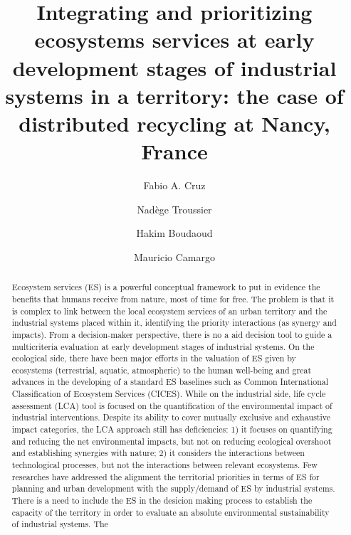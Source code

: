 \documentclass[]{elsarticle} %
\begin{document}
\begin{frontmatter}

  \title{Integrating and prioritizing ecosystems services at early
development stages of industrial systems in a territory: the case of
distributed recycling at Nancy, France}
    \author[UTT]{Fabio A. Cruz}
    \author[UTT]{Nadège Troussier}
  
    \author[UL]{Hakim Boudaoud}
  
    \author[UL]{Mauricio Camargo}
  
      \address[UTT]{Universite de Technologie de Troyes, Troyes, France}
    \address[UL]{ERPI, Université de Lorraine, F-54000 Nancy, France.}
  
  \begin{abstract}
  Ecosystem services (ES) is a powerful conceptual framework to put in
  evidence the benefits that humans receive from nature, most of time
  for free. The problem is that it is complex to link between the local
  ecosystem services of an urban territory and the industrial systems
  placed within it, identifying the priority interactions (as synergy
  and impacts). From a decision-maker perspective, there is no a aid
  decision tool to guide a multicriteria evaluation at early development
  stages of industrial systems. On the ecological side, there have been
  major efforts in the valuation of ES given by ecosystems (terrestrial,
  aquatic, atmospheric) to the human well-being and great advances in
  the developing of a standard ES baselines such as Common International
  Classification of Ecosystem Services (CICES). While on the industrial
  side, life cycle assessment (LCA) tool is focused on the
  quantification of the environmental impact of industrial
  interventions. Despite its ability to cover mutually exclusive and
  exhaustive impact categories, the LCA approach still has deficiencies:
  1) it focuses on quantifying and reducing the net environmental
  impacts, but not on reducing ecological overshoot and establishing
  synergies with nature; 2) it considers the interactions between
  technological processes, but not the interactions between relevant
  ecosystems. Few researches have addressed the alignment the
  territorial priorities in terms of ES for planning and urban
  development with the supply/demand of ES by industrial systems. There
  is a need to include the ES in the desicion making process to
  establish the capacity of the territory in order to evaluate an
  absolute environmental sustainability of industrial systems. The

\end{abstract}
\end{frontmatter}
\end{document}
